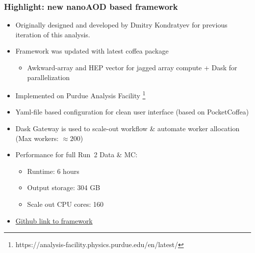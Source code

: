 \documentclass[dvipsnames,aspectratio=169]{beamer}
\begin{document}
\begin{frame}
    \frametitle{Highlight: new nanoAOD based framework}
    \begin{itemize}
    \item Originally designed and developed by Dmitry Kondratyev for previous iteration of this analysis.
    \item Framework was updated with latest coffea package
    \begin{itemize}
    \item Awkward-array and HEP vector for jagged array compute + Dask for parallelization
    \end{itemize}
    \item Implemented on Purdue Analysis Facility \footnote{https://analysis-facility.physics.purdue.edu/en/latest/}
    \item Yaml-file based configuration for clean user interface (based on PocketCoffea)
    \item Dask Gateway is used to scale-out workflow \& automate worker allocation (Max workers: $\approx200$)
    \item Performance for full Run~2 Data \& MC:
    \begin{itemize}
    \item Runtime: 6 hours
    \item Output storage: 304 GB
    \item Scale out CPU cores: 160
    \end{itemize}
    \item \href{https://github.com/green-cabbage/copperheadV2}{Github link to framework}
    \end{itemize}
\end{frame}
\end{document}
